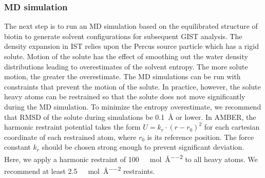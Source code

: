 \documentclass[9pt,tutorial,pubversion]{livecoms}
\begin{document}
\subsubsection{MD simulation}
\label{sec:md_simulation}
The next step is to run an MD simulation based on the equilibrated structure of biotin to generate solvent configurations for subsequent GIST analysis. 
The density expansion in IST relies upon the Percus source particle \cite{lebowitz_percus_1964} which has a rigid solute. 
Motion of the solute has the effect of smoothing out the water density distributions leading to overestimates of the solvent entropy. 
The more solute motion, the greater the overestimate. The MD simulations can be run with constraints that prevent the motion of the solute. 
In practice, however, the solute heavy atoms can be restrained so that the solute does not move significantly during the MD simulation. 
To minimize the entropy overestimate, we recommend that RMSD of the solute during simulations be \qty{0.1}{\angstrom} or lower.  
In AMBER, the harmonic restraint potential takes the form $U = k_r \cdot (r - r_0)^2$ for each cartesian coordinate of each restrained atom, where $r_0$ is its reference position. 
The force constant $k_r$ should be chosen strong enough to prevent significant deviation. 
Here, we apply a harmonic restraint of \qty{100}{\kilo\calorie\per\mole\per\angstrom\squared} to all heavy atoms. 
We recommend at least \qty{2.5}{\kilo\calorie\per\mole\per\angstrom\squared} restraints. 
\end{document}

